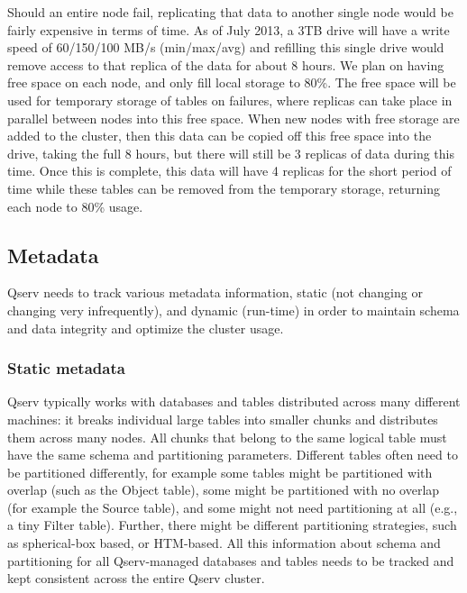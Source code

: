 \documentclass[DM,lsstdraft,toc]{lsstdoc}
\begin{document}
Should an entire node fail, replicating that data to another single node
would be fairly expensive in terms of time. As of July 2013, a 3TB drive
will have a write speed of 60/150/100 MB/s (min/max/avg) \citep{Kirsch:2012}
and refilling
this single drive would remove access to that replica of the data for
about 8 hours. We plan on having free space on each node, and only fill
local storage to 80\%. The free space will be used for temporary storage
of tables on failures, where replicas can take place in parallel between
nodes into this free space. When new nodes with free storage are added
to the cluster, then this data can be copied off this free space into
the drive, taking the full 8 hours, but there will still be 3 replicas
of data during this time. Once this is complete, this data will have 4
replicas for the short period of time while these tables can be removed
from the temporary storage, returning each node to 80\% usage.

\subsection{Metadata}\label{metadata}

Qserv needs to track various metadata information, static (not changing
or changing very infrequently), and dynamic (run-time) in order to
maintain schema and data integrity and optimize the cluster usage.

\subsubsection{Static metadata}\label{static-metadata}

Qserv typically works with databases and tables distributed across many
different machines: it breaks individual large tables into smaller
chunks and distributes them across many nodes. All chunks that belong to
the same logical table must have the same schema and partitioning
parameters. Different tables often need to be partitioned differently,
for example some tables might be partitioned with overlap (such as the
Object table), some might be partitioned with no overlap (for example
the Source table), and some might not need partitioning at all (e.g., a
tiny Filter table). Further, there might be different partitioning
strategies, such as spherical-box based, or HTM-based. All this
information about schema and partitioning for all Qserv-managed
databases and tables needs to be tracked and kept consistent across the
entire Qserv cluster.
\end{document}
